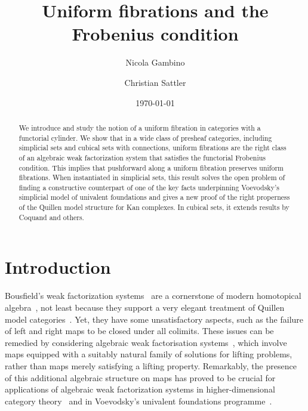 \documentclass[reqno,10pt,a4paper,oneside,draft]{amsart}
\title{Uniform fibrations and the Frobenius condition}
\begin{document}
\begin{abstract}
We introduce and study the notion of a uniform fibration in categories with a functorial cylinder.
We show that in a wide class of presheaf categories, including simplicial sets and cubical sets with connections, uniform fibrations are the right class of an algebraic weak factorization system that satisfies the functorial Frobenius condition.
This implies that pushforward along a uniform fibration preserves uniform fibrations.
When instantiated in simplicial sets, this result solves the open problem of
finding a constructive counterpart of one of the key facts underpinning Voevodsky's simplicial model of univalent foundations and gives a new proof of the right properness of
the Quillen model structure for Kan complexes. In cubical sets, it extends results by Coquand and others.
\end{abstract}

\author{Nicola Gambino}
\address{School of Mathematics, University of Leeds, Leeds LS2 9JT, UK}

\author{Christian Sattler}
\address{School of Mathematics, University of Leeds, Leeds LS2 9JT, UK}

\date{\today}

\maketitle


\section*{Introduction}

Bousfield's weak factorization systems~\cite{bousfield-wfs} are a cornerstone of 
modern homotopical algebra~\cite{quillen-homotopical}, not least because they support a very elegant treatment 
of Quillen model categories~\cite{joyal-tierney-notes}. Yet, they have some unsatisfactory 
aspects, such as the failure of left and right maps to be closed under all colimits.
These issues can be
remedied by considering algebraic weak factorisation  systems~\cite{garner:small-object-argument,grandis-tholen-nwfs}, 
which involve maps equipped with a suitably natural
family of solutions for lifting problems, rather than maps merely satisfying
a lifting property. Remarkably, the presence of this additional algebraic structure on maps has proved to be crucial  for  applications of algebraic weak factorization systems in
hi\-gher-di\-men\-sional category theory~\cite{batanin-cisinski-weber,garner:globular-operator-awfs,garner-homomorphisms}
and in Voevodsky's univalent foundations programme~\cite{awodey-cubical,coquand-cubical-sets,cohen-et-al:cubicaltt,pitts-cubical-nominal,swan-awfs}.  
  
\end{document}

